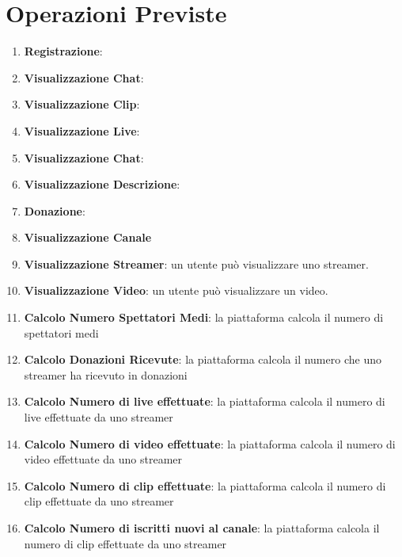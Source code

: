 \section{Operazioni Previste}
\begin{enumerate}
    \item \textbf{Registrazione}: 
    \item \textbf{Visualizzazione Chat}:
    \item \textbf{Visualizzazione Clip}: 
    \item \textbf{Visualizzazione Live}: 
    \item \textbf{Visualizzazione Chat}: 
    \item \textbf{Visualizzazione Descrizione}:
    \item \textbf{Donazione}:
    \item \textbf{Visualizzazione Canale}
    \item \textbf{Visualizzazione Streamer}: un utente può visualizzare uno streamer.
    \item \textbf{Visualizzazione Video}: un utente può visualizzare un video.
    \item \textbf{Calcolo Numero Spettatori Medi}: la piattaforma calcola il numero di spettatori medi 
    \item \textbf{Calcolo Donazioni Ricevute}: la piattaforma calcola il numero che uno streamer ha ricevuto in donazioni 
    \item \textbf{Calcolo Numero di live effettuate}: la piattaforma calcola il numero di live effettuate da uno streamer 
    \item \textbf{Calcolo Numero di video effettuate}: la piattaforma calcola il numero di video effettuate da uno streamer 
    \item \textbf{Calcolo Numero di clip effettuate}: la piattaforma calcola il numero di clip effettuate da uno streamer 
    \item \textbf{Calcolo Numero di iscritti nuovi al canale}: la piattaforma calcola il numero di clip effettuate da uno streamer 
\end{enumerate}
